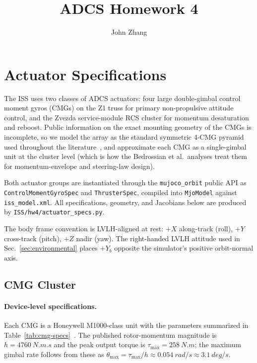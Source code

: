 \documentclass[conference]{IEEEtran}
\title{ADCS Homework 4}
\author{John Zhang}
\begin{document}
\maketitle

\section{Actuator Specifications}
\label{sec:actuators}

The ISS uses two classes of ADCS actuators: four large double-gimbal
control moment gyros (CMGs) on the Z1 truss for primary non-propulsive
attitude control, and the Zvezda service-module RCS cluster for
momentum desaturation and reboost.  Public information on the exact
mounting geometry of the CMGs is incomplete, so we model the array as
the standard symmetric 4-CMG pyramid used throughout the
literature~\cite{wie2008,bedrossian2009}, and approximate each CMG as a
single-gimbal unit at the cluster level (which is how the Bedrossian et
al.\ analyses treat them for momentum-envelope and steering-law design).

Both actuator groups are instantiated through the
\texttt{mujoco\_orbit} public API as
\texttt{ControlMomentGyroSpec} and \texttt{ThrusterSpec}, compiled into
\texttt{MjoModel} against \texttt{iss\_model.xml}.  All specifications,
geometry, and Jacobians below are produced by
\texttt{ISS/hw4/actuator\_specs.py}.

The body frame convention is LVLH-aligned at rest: $+X$ along-track
(roll), $+Y$ cross-track (pitch), $+Z$ nadir (yaw).  The
right-handed LVLH attitude used in Sec.~\ref{sec:environmental} places
$+Y_b$ opposite the simulator's positive orbit-normal axis.

\subsection{CMG Cluster}
\label{sec:cmg}

\paragraph{Device-level specifications.}  Each CMG is a Honeywell
M1000-class unit with the parameters summarized in
Table~\ref{tab:cmg-specs}~\cite{wie2008,hondatasheet}.  The published
rotor-momentum magnitude is $h = \SI{4760}{N.m.s}$ and the peak output
torque is $\tau_{\max} = \SI{258}{N.m}$; the maximum gimbal rate
follows from these as
$\dot\theta_{\max} = \tau_{\max}/h \approx \SI{0.054}{rad/s}
\approx \SI{3.1}{deg/s}$.
\end{document}
